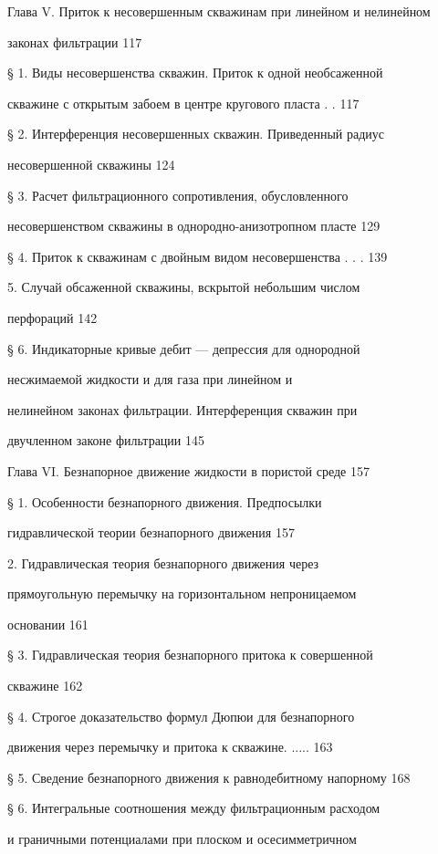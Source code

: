 \documentclass[
  11pt,
]{article}
\begin{document}
Глава V. Приток к несовершенным скважинам при линейном и нелинейном \par
законах фильтрации 117 \par
§ 1. Виды несовершенства скважин. Приток к одной необсаженной \par
скважине с открытым забоем в центре кругового пласта . . 117 \par
§ 2. Интерференция несовершенных скважин. Приведенный радиус \par
несовершенной скважины 124 \par
§ 3. Расчет фильтрационного сопротивления, обусловленного \par
несовершенством скважины в однородно-анизотропном пласте 129 \par
§ 4. Приток к скважинам с двойным видом несовершенства . . . 139 \par
\textbar{} 5. Случай обсаженной скважины, вскрытой небольшим числом \par
перфораций 142 \par
§ 6. Индикаторные кривые дебит --- депрессия для однородной \par
несжимаемой жидкости и для газа при линейном и  \par
нелинейном законах фильтрации. Интерференция скважин при  \par
двучленном законе фильтрации 145 \par
Глава VI. Безнапорное движение жидкости в пористой среде 157 \par
§ 1. Особенности безнапорного движения. Предпосылки  \par
гидравлической теории безнапорного движения 157 \par
\textbar{} 2. Гидравлическая теория безнапорного движения через  \par
прямоугольную перемычку на горизонтальном непроницаемом  \par
основании 161 \par
§ 3. Гидравлическая теория безнапорного притока к совершенной \par
скважине 162 \par
§ 4. Строгое доказательство формул Дюпюи для безнапорного \par
движения через перемычку и притока к скважине. ..... 163 \par
§ 5. Сведение безнапорного движения к равнодебитному напорному 168 \par
§ 6. Интегральные соотношения между фильтрационным расходом \par
и граничными потенциалами при плоском и осесимметричном \par
\end{document}
